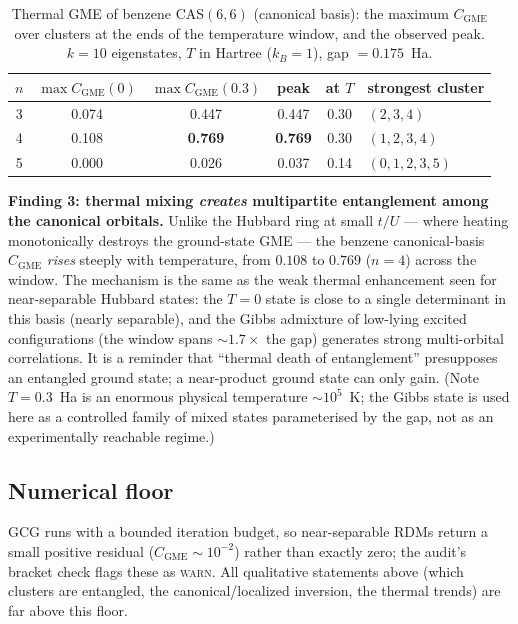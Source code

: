 \documentclass[11pt]{article}
\newcommand{\CGME}{\ensuremath{C_{\mathrm{GME}}}}
\begin{document}
\begin{table}[h!]
\centering
\caption{Thermal GME of benzene CAS$(6,6)$ (canonical basis): the maximum
\CGME{} over clusters at the ends of the temperature window, and the observed
peak. $k=10$ eigenstates, $T$ in Hartree ($k_B{=}1$), gap $=0.175$~Ha.}
\label{tab:thermal}
\begin{tabular}{@{}c cccc l@{}}
\toprule
$n$ & $\max\CGME(0)$ & $\max\CGME(0.3)$ & peak & at $T$ & strongest cluster \\
\midrule
3 & 0.074 & 0.447 & 0.447 & 0.30 & $(2,3,4)$ \\
4 & 0.108 & \textbf{0.769} & \textbf{0.769} & 0.30 & $(1,2,3,4)$ \\
5 & 0.000 & 0.026 & 0.037 & 0.14 & $(0,1,2,3,5)$ \\
\bottomrule
\end{tabular}
\end{table}

\noindent\textbf{Finding 3: thermal mixing \emph{creates} multipartite
entanglement among the canonical orbitals.} Unlike the Hubbard ring at small
$t/U$ --- where heating monotonically destroys the ground-state GME --- the
benzene canonical-basis \CGME{} \emph{rises} steeply with temperature, from
$0.108$ to $0.769$ ($n{=}4$) across the window. The mechanism is the same as
the weak thermal enhancement seen for near-separable Hubbard states: the $T=0$
state is close to a single determinant in this basis (nearly separable), and
the Gibbs admixture of low-lying excited configurations (the window spans
$\sim\!1.7\times$ the gap) generates strong multi-orbital correlations. It is a
reminder that ``thermal death of entanglement'' presupposes an entangled ground
state; a near-product ground state can only gain. (Note $T=0.3$~Ha is an
enormous physical temperature $\sim\!10^5$~K; the Gibbs state is used here as a
controlled family of mixed states parameterised by the gap, not as an
experimentally reachable regime.)

\subsection{Numerical floor}
GCG runs with a bounded iteration budget, so near-separable RDMs return a small
positive residual ($\CGME\sim10^{-2}$) rather than exactly zero; the audit's
bracket check flags these as \textsc{warn}. All qualitative statements above
(which clusters are entangled, the canonical/localized inversion, the thermal
trends) are far above this floor.
\end{document}
